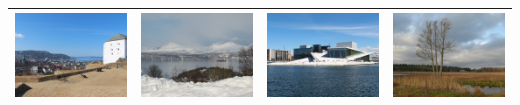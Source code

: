\begin{small}
\begin{center}
\begin{longtable}{|c|c|c|c|}
 \hyperref[sec:NTNU]{\includegraphics[keepaspectratio,width=9em,height=6em]{NorNet-Configuration-Images/Universitetet_i_Trondheim.jpeg}} & \hyperref[sec:HiN]{\includegraphics[keepaspectratio,width=9em,height=6em]{NorNet-Configuration-Images/Hoegskolen_i_Narvik.jpeg}} & \hyperref[sec:HiOA]{\includegraphics[keepaspectratio,width=9em,height=6em]{NorNet-Configuration-Images/Hoegskolen_i_Oslo_og_Akershus.jpeg}} & \hyperref[sec:KAU]{\includegraphics[keepaspectratio,width=9em,height=6em]{NorNet-Configuration-Images/Karlstads_Universitet.jpeg}} \\ \hline

\end{longtable}
\end{center}
\end{small}
